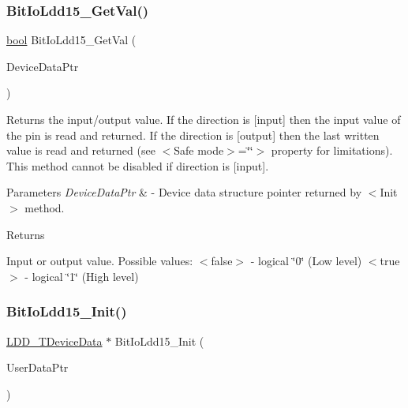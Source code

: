 \subsubsection{\texorpdfstring{Bit\+Io\+Ldd15\+\_\+\+Get\+Val()}{BitIoLdd15\_GetVal()}}
{\footnotesize\ttfamily \hyperlink{group___p_e___types__module_ga97a80ca1602ebf2303258971a2c938e2}{bool} Bit\+Io\+Ldd15\+\_\+\+Get\+Val (\begin{DoxyParamCaption}\item[{\hyperlink{group___p_e___types__module_gac5cf1362f1f0e3a2ce71b1bf2276d091}{L\+D\+D\+\_\+\+T\+Device\+Data} $\ast$}]{Device\+Data\+Ptr }\end{DoxyParamCaption})}



Returns the input/output value. If the direction is \mbox{[}input\mbox{]} then the input value of the pin is read and returned. If the direction is \mbox{[}output\mbox{]} then the last written value is read and returned (see $<$\+Safe mode$>$=\char`\"{}\char`\"{}$>$ property for limitations). This method cannot be disabled if direction is \mbox{[}input\mbox{]}. 


\begin{DoxyParams}{Parameters}
{\em Device\+Data\+Ptr} & -\/ Device data structure pointer returned by $<$\+Init$>$ method. \\
\hline
\end{DoxyParams}
\begin{DoxyReturn}{Returns}

\begin{DoxyItemize}
\item Input or output value. Possible values\+: $<$false$>$ -\/ logical \char`\"{}0\char`\"{} (Low level) $<$true$>$ -\/ logical \char`\"{}1\char`\"{} (High level) 
\end{DoxyItemize}
\end{DoxyReturn}
\mbox{\label{group___bit_io_ldd15__module_gae933572e69dc3cc23725af8444104156}} 
\subsubsection{\texorpdfstring{Bit\+Io\+Ldd15\+\_\+\+Init()}{BitIoLdd15\_Init()}}
{\footnotesize\ttfamily \hyperlink{group___p_e___types__module_gac5cf1362f1f0e3a2ce71b1bf2276d091}{L\+D\+D\+\_\+\+T\+Device\+Data} $\ast$ Bit\+Io\+Ldd15\+\_\+\+Init (\begin{DoxyParamCaption}\item[{\hyperlink{group___p_e___types__module_ga0b66a73f87238a782318aa0be7578e35}{L\+D\+D\+\_\+\+T\+User\+Data} $\ast$}]{User\+Data\+Ptr }\end{DoxyParamCaption})}



